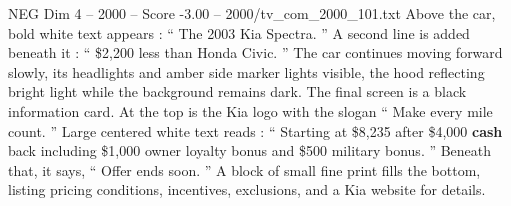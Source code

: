 \begin{textsample}{NEG Dim 4 – 2000 – Score -3.00 – 2000/tv\_com\_2000\_101.txt}
Above the car, bold white text appears : “ The 2003 Kia Spectra. ” A second line is added beneath it : “ \$2,200 less than Honda Civic. ” The car continues moving forward slowly, its headlights and amber side marker lights visible, the hood reflecting bright light while the background remains dark.
The final screen is a black information card.
At the top is the Kia logo with the slogan “ Make every mile count. ” Large centered white text reads : “ Starting at \$8,235 after \$4,000 \textbf{cash} back including \$1,000 owner loyalty bonus and \$500 military bonus. ” Beneath that, it says, “ Offer ends soon. ” A block of small fine print fills the bottom, listing pricing conditions, incentives, exclusions, and a Kia website for details.

\end{textsample}

